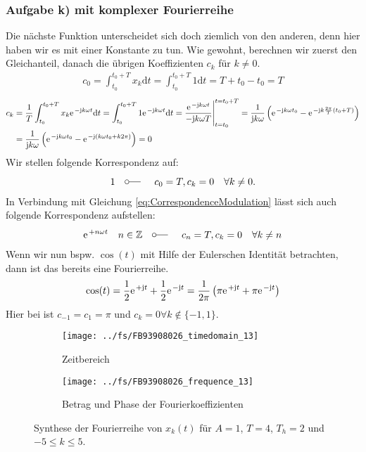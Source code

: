 \documentclass[11pt,a4paper,DIV=12]{scrartcl}
\newcommand{\diff}{\mathrm{d}}
\begin{document}
\subsubsection*{Aufgabe k) mit komplexer Fourierreihe}
%
%
Die nächste Funktion unterscheidet sich doch ziemlich von den anderen, denn hier
haben wir es mit einer Konstante zu tun.
%
Wie gewohnt, berechnen wir zuerst den Gleichanteil, danach die übrigen
Koeffizienten $c_k$ für $k\neq 0$.
%
\begin{align}
	c_0=\int_{t_0}^{t_0+T}x_{k}\diff t
	=\int_{t_0}^{t_0+T}1\diff t
	=T+t_0-t_0=T
\end{align}
%
\begin{align}
	c_k&=\frac{1}{T}\int_{t_0}^{t_0+T}x_{k}\e^{-\im k \omega t}\diff t
	=\int_{t_0}^{t_0+T}1\e^{-\im k \omega t}\diff t
	=\frac{\e^{-\im k \omega t}}{-\im k \omega T}\Bigg |_{t=t_0}^{t=t_0+T}
	=\frac{1}{\im k \omega }\left (\e^{-\im k \omega t_0}-\e^{-\im k \frac{2\pi}{T}(t_0+T)}\right )\nonumber \\
	&=\frac{1}{\im k \omega}\left (\e^{-\im k \omega t_0}-\e^{-\im (k \omega t_0+k2\pi )}\right )=0
\end{align}
%
Wir stellen folgende Korrespondenz auf:
%
\begin{align}
	1 \quad \fourier \quad c_0 = T,c_k=0\quad\forall k \neq 0.
\end{align}
%
In Verbindung mit Gleichung \eqref{eq:CorrespondenceModulation} lässt sich auch
folgende Korrespondenz aufstellen:
%
\begin{align}
	\e^{+n\omega t}\quad n\in\mathbb{Z}\quad \fourier\quad c_n=T,c_k=0\quad\forall k\neq n
\end{align}
%
Wenn wir nun bspw. $\cos(t)$ mit Hilfe der Eulerschen Identität betrachten,
dann ist das bereits eine Fourierreihe.
%
\begin{align}
	\cos(t)=\frac{1}{2}\e^{+\im t}+\frac{1}{2}\e^{-\im t}=\frac{1}{2\pi}\left(\pi\e^{+\im t}+\pi\e^{-\im t}\right)
\end{align}
%
Hier bei ist $c_{-1}=c_1=\pi$ und $c_k=0\forall k \not\in\{-1,1\}$.
%
\begin{figure}
	\centering
	\begin{subfigure}{\textwidth}
		\texttt{[image: ../fs/FB93908026\_timedomain\_13]}
		\caption{Zeitbereich}
	\end{subfigure}
	\begin{subfigure}{\textwidth}
		\texttt{[image: ../fs/FB93908026\_frequence\_13]}
		\caption{Betrag und Phase der Fourierkoeffizienten}
	\end{subfigure}
	\caption{Synthese der Fourierreihe von $x_k(t)$ für $A=1$, $T=4$, $T_h=2$ und
		$-5\leq k\leq5$.}
\end{figure}
%
\newpage
\end{document}
